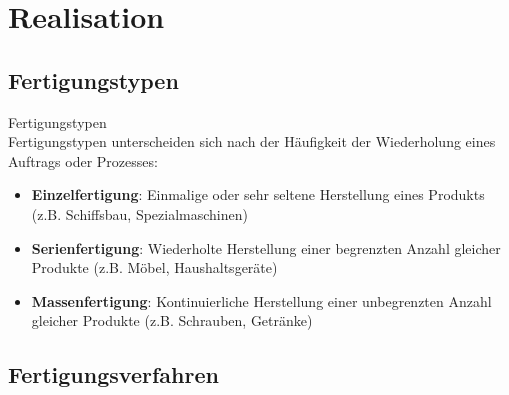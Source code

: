 \section{Realisation}

\subsection{Fertigungstypen}

\begin{definition}{Fertigungstypen}\\
Fertigungstypen unterscheiden sich nach der Häufigkeit der Wiederholung eines Auftrags oder Prozesses:
\begin{itemize}
    \item \textbf{Einzelfertigung}: Einmalige oder sehr seltene Herstellung eines Produkts (z.B. Schiffsbau, Spezialmaschinen)
    \item \textbf{Serienfertigung}: Wiederholte Herstellung einer begrenzten Anzahl gleicher Produkte (z.B. Möbel, Haushaltsgeräte)
    \item \textbf{Massenfertigung}: Kontinuierliche Herstellung einer unbegrenzten Anzahl gleicher Produkte (z.B. Schrauben, Getränke)
\end{itemize}
\end{definition}

\subsection{Fertigungsverfahren}

